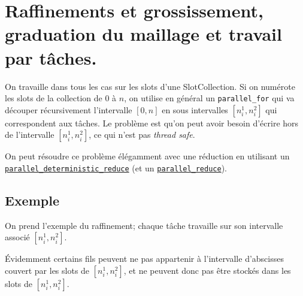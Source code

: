\documentclass[10pt]{article}
\begin{document}
\lstset{language=C++}
\section{Raffinements et grossissement, graduation du maillage et
  travail par tâches.}
On travaille dans tous les cas sur les slots d'une SlotCollection. Si
on numérote les slots de la collection de 0 à $n$, on utilise en
général un \texttt{parallel\_for} qui va découper récursivement
l'intervalle $[0,n]$ en sous intervalles $[n_i^1,n_i^2]$ qui
correspondent aux tâches. Le problème est qu'on peut avoir besoin
d'écrire hors de l'intervalle  $[n_i^1,n_i^2]$, ce qui n'est pas
\emph{thread safe}.

On peut résoudre ce problème élégamment avec une réduction en utilisant
un
\href{https://software.intel.com/en-us/node/506155}{\texttt{parallel\_deterministic\_reduce}}
(et un
\href{https://software.intel.com/en-us/node/506154}{\texttt{parallel\_reduce}}).

\subsection{Exemple}On prend l'exemple
du raffinement; chaque tâche travaille sur son intervalle associé
$[n_i^1,n_i^2]$.

\begin{algorithm}[H]
\end{algorithm}
Évidemment certains fils peuvent ne pas appartenir à l'intervalle
d'abscisses couvert par les slots de  $[n_i^1,n_i^2]$, et ne peuvent
donc pas être stockés dans les slots de  $[n_i^1,n_i^2]$.
\end{document}
